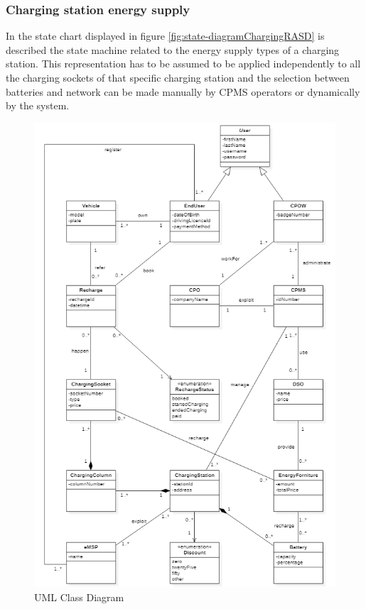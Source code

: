 \documentclass[a4paper]{report}
\begin{document}
\subsubsection{Charging station energy supply}
In the state chart displayed in figure \ref{fig:state-diagramChargingRASD} is described the state machine related to the energy supply types of a charging station. This representation has to be assumed to be applied independently to all the charging sockets of that specific charging station and the selection between batteries and network can be made manually by CPMS operators or dynamically by the system.

\begin{figure}[p]
\includegraphics[width=\textwidth]{classDiagramRASDFinal.png}
\caption{UML Class Diagram}
\label{fig:class-diagramRASD}
\end{figure}
\restoregeometry
\end{document}
